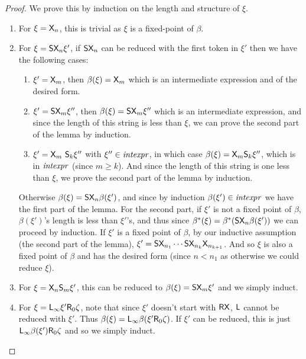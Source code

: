 \documentclass{llncs}
\begin{document}
\begin{proof}

    We prove this by induction on the length and structure of $\xi$.
    \begin{enumerate}
        \item For $\xi=\mathsf{X}_n$, this is trivial as $\xi$ is a fixed-point of $\beta$.
        \item For $\xi=\mathsf{S}\mathsf{X}_n\xi'$, if $\mathsf{S}\mathsf{X}_n$ can be reduced with the first token in $\xi'$ then we have the following cases:
        \begin{enumerate}
            \item $\xi'=\mathsf{X}_m$, then $\beta(\xi)=\mathsf{X}_m$ which is an intermediate expression and of the desired form.
            \item $\xi'=\mathsf{S}\mathsf{X}_m\xi''$, then $\beta(\xi)=\mathsf{S}\mathsf{X}_m\xi''$ which is an intermediate expression, and since the length of this string is less than $\xi$, we can prove the second part of
            the lemma by induction.
            \item $\xi'=\mathsf{X}_m\ \mathsf{S}_k\xi''$ with $\xi''\in{\it intexpr}$, in which case $\beta(\xi)=\mathsf{X}_m\mathsf{S}_k\xi''$, which is in ${\it intexpr}$ (since $m\geq k$).
            And since the length of this string is one less than $\xi$, we prove the second part of the lemma by induction.
        \end{enumerate}
        Otherwise $\beta(\xi)=\mathsf{S}\mathsf{X}_n\beta(\xi')$, and since by induction $\beta(\xi')\in{\it intexpr}$ we have the first part of the lemma.
        For the second part, if $\xi'$ is not a fixed point of $\beta$, $\beta(\xi')$'s length is less than $\xi'$'s, and thus since $\beta^*(\xi)=\beta^*(\mathsf{S}\mathsf{X}_n\beta(\xi'))$ we can proceed by
        induction.
        If $\xi'$ is a fixed point of $\beta$, by our inductive assumption (the second part of the lemma), $\xi'=\mathsf{S}\mathsf{X}_{n_1}\cdots\mathsf{S}\mathsf{X}_{n_k}\mathsf{X}_{n_{k+1}}$.
        And so $\xi$ is also a fixed point of $\beta$ and has the desired form (since $n<n_1$ as otherwise we could reduce $\xi$).
        \item For $\xi=\mathsf{X}_n\mathsf{S}_m\xi'$, this can be reduced to $\beta(\xi)=\mathsf{S}\mathsf{X}_m\xi'$ and we simply induct.
        \item For $\xi=\mathsf{L}_\infty\xi'\mathsf{R}_0\zeta$, note that since $\xi'$ doesn't start with $\mathsf{R}\mathsf{X}$, $\mathsf{L}$ cannot be reduced with $\xi'$.
        Thus $\beta(\xi)=\mathsf{L}_\infty\beta(\xi'\mathsf{R}_0\zeta)$.
        If $\xi'$ can be reduced, this is just $\mathsf{L}_\infty\beta(\xi')\mathsf{R}_0\zeta$ and so we simply induct.


\end{enumerate}
\end{proof}
\end{document}
